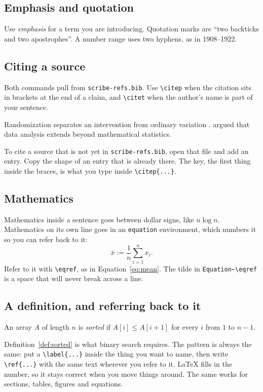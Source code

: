 \subsection*{Emphasis and quotation}
Use \emph{emphasis} for a term you are introducing. Quotation marks are
``two backticks and two apostrophes''. A number range uses two hyphens,
as in 1908--1922.

\subsection*{Citing a source}
Both commands pull from \texttt{scribe-refs.bib}. Use \verb|\citep| when the
citation sits in brackets at the end of a claim, and \verb|\citet| when the
author's name is part of your sentence.

Randomization separates an intervention from ordinary variation
\citep{fisher1935design}. \citet{tukey1962future} argued that data analysis
extends beyond mathematical statistics.

To cite a source that is not yet in \texttt{scribe-refs.bib}, open that file
and add an entry. Copy the shape of an entry that is already there. The key,
the first thing inside the braces, is what you type inside \verb|\citep{...}|.

\subsection*{Mathematics}
Mathematics inside a sentence goes between dollar signs, like $n \log n$.
Mathematics on its own line goes in an \texttt{equation} environment, which
numbers it so you can refer back to it:
\begin{equation}\label{eq:mean}
  \bar{x} := \frac{1}{n} \sum_{i=1}^{n} x_i .
\end{equation}
Refer to it with \verb|\eqref|, as in Equation~\eqref{eq:mean}. The tilde in
\verb|Equation~\eqref| is a space that will never break across a line.

\subsection*{A definition, and referring back to it}
\begin{definition}
\label{def:sorted}
An array $A$ of length $n$ is \emph{sorted} if $A[i] \le A[i+1]$ for every
$i$ from $1$ to $n-1$.
\end{definition}

Definition~\ref{def:sorted} is what binary search requires. The pattern is
always the same: put a \verb|\label{...}| inside the thing you want to name,
then write \verb|\ref{...}| with the same text wherever you refer to it.
LaTeX fills in the number, so it stays correct when you move things around.
The same works for sections, tables, figures and equations.


